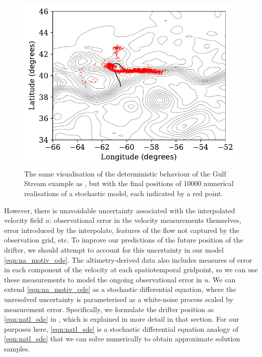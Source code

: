 \begin{figure}
	\begin{center}
		\includegraphics[width=\textwidth]{chp02_background/figures/gulf_stream_motivation/num_rels.pdf}
		\caption{The same visualisation of the deterministic behaviour of the Gulf Stream example as , but with the final positions of 10000 numerical realisations of a stochastic model, each indicated by a red point.}
		\label{fig:na_motiv_rels}
	\end{center}
\end{figure}


However, there is unavoidable uncertainty associated with the interpolated velocity field \(u\): observational error in the velocity measurements themselves, error introduced by the interpolate, features of the flow not captured by the observation grid, etc.
To improve our predictions of the future position of the drifter, we should attempt to account for this uncertainty in our model \eqref{eqn:na_motiv_ode}.
The altimetry-derived data also includes measures of error in each component of the velocity at each spatiotemporal gridpoint, so we can use these measurements to model the ongoing observational error in \(u\).
We can extend \eqref{eqn:na_motiv_ode} as a stochastic differential equation, where the unresolved uncertainty is parameterised as a white-noise process scaled by measurement error.
Specifically, we formulate the drifter position as \eqref{eqn:natl_sde} in , which is explained in more detail in that section.
For our purposes here, \eqref{eqn:natl_sde} is a stochastic differential equation analogy of \eqref{eqn:natl_sde} that we can solve numerically to obtain approximate solution samples.

